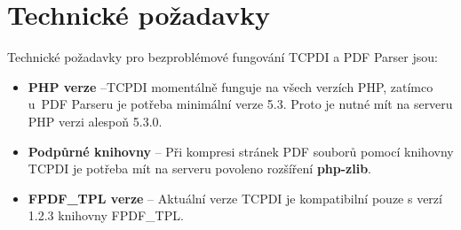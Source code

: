 \section{Technické požadavky}
Technické požadavky pro bezproblémové fungování TCPDI a PDF Parser jsou:
\begin{itemize} 
	\item \textbf{PHP verze} --TCPDI  momentálně funguje na všech verzích PHP, zatímco u~PDF Parseru je potřeba minimální verze 5.3. Proto je nutné mít na serveru PHP verzi alespoň 5.3.0.
	\item \textbf{Podpůrné knihovny} -- Při kompresi stránek PDF souborů pomocí knihovny TCPDI je potřeba mít na serveru povoleno rozšíření \textbf{php-zlib}.
	\item \textbf{FPDF\_TPL verze} -- Aktuální verze TCPDI je kompatibilní pouze s verzí 1.2.3 knihovny FPDF\_TPL. 
\end{itemize}
